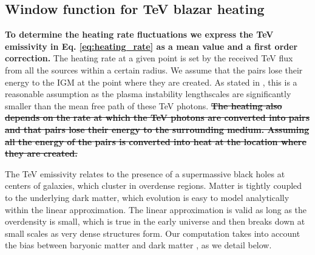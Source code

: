 \documentclass[twocolumns]{emulateapj}
\newcommand\ALc[1]{{\color{red} \bf #1}} %
\newcommand\Pc[1]{{\color{cyan} \bf #1}} %
\begin{document}
\subsection{Window function for TeV blazar heating}
\ALc{ To determine the heating rate fluctuations we express the TeV emissivity in Eq. \ref{eq:heating_rate} as a mean value and a first order correction.} The heating rate at a given point is set by the received TeV flux from all the sources within a certain radius. We assume that the pairs lose their energy to the IGM at the point where they are created.  As stated in \citet{2012ApJ...752...22B}, this is a reasonable assumption as the plasma instability lengthscales are significantly smaller than the mean free path of these TeV photons. \ALc{\sout{The heating also depends on the rate at which the TeV photons are converted into pairs and that pairs lose their energy to the surrounding medium.  Assuming all the energy of the pairs is converted into heat at the location where they are created.}}


 The TeV emissivity relates to the presence of a supermassive black holes at centers of galaxies, which cluster in overdense regions. Matter is tightly coupled to the underlying dark matter, which evolution is easy to model analytically within the linear approximation.  The linear approximation is valid as long as the overdensity is small, which is true in the early universe and then breaks down at small scales as very dense structures form.  Our computation takes into account the bias between baryonic matter and dark matter \citep{1996MNRAS.282..347M}, as we detail below.
\end{document}
